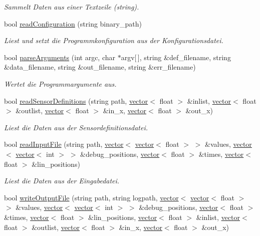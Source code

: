 \begin{DoxyCompactItemize}
\begin{DoxyCompactList}\small\item\em Sammelt Daten aus einer Textzeile (string). \end{DoxyCompactList}\item 
bool \hyperlink{classOdisiToSdConverter_a8c6bc01ae2c063d89dc64c0a7d68c033}{read\-Configuration} (string binary\-\_\-path)
\begin{DoxyCompactList}\small\item\em Liest und setzt die Programmkonfiguration aus der Konfigurationsdatei. \end{DoxyCompactList}\item 
bool \hyperlink{classOdisiToSdConverter_ac8d40f3edad9af5004d516809e0e40a2}{parse\-Arguments} (int argc, char $\ast$argv\mbox{[}$\,$\mbox{]}, string \&def\-\_\-filename, string \&data\-\_\-filename, string \&out\-\_\-filename, string \&err\-\_\-filename)
\begin{DoxyCompactList}\small\item\em Wertet die Programmargumente aus. \end{DoxyCompactList}\item 
bool \hyperlink{classOdisiToSdConverter_a436916f864cbfc7a9cefa5e0f640c683}{read\-Sensor\-Definitions} (string path, \hyperlink{classstd_1_1vector}{vector}$<$ float $>$ \&inlist, \hyperlink{classstd_1_1vector}{vector}$<$ float $>$ \&outlist, \hyperlink{classstd_1_1vector}{vector}$<$ float $>$ \&in\-\_\-x, \hyperlink{classstd_1_1vector}{vector}$<$ float $>$ \&out\-\_\-x)
\begin{DoxyCompactList}\small\item\em Liest die Daten aus der Sensordefinitionsdatei. \end{DoxyCompactList}\item 
bool \hyperlink{classOdisiToSdConverter_a270932ed908757ac477370eef64db442}{read\-Input\-File} (string path, \hyperlink{classstd_1_1vector}{vector}$<$ \hyperlink{classstd_1_1vector}{vector}$<$ float $>$ $>$ \&values, \hyperlink{classstd_1_1vector}{vector}$<$ \hyperlink{classstd_1_1vector}{vector}$<$ int $>$ $>$ \&debug\-\_\-positions, \hyperlink{classstd_1_1vector}{vector}$<$ float $>$ \&times, \hyperlink{classstd_1_1vector}{vector}$<$ float $>$ \&lin\-\_\-positions)
\begin{DoxyCompactList}\small\item\em Liest die Daten aus der Eingabedatei. \end{DoxyCompactList}\item 
bool \hyperlink{classOdisiToSdConverter_a869a2571e5788922826f4bc63adbbe18}{write\-Output\-File} (string path, string logpath, \hyperlink{classstd_1_1vector}{vector}$<$ \hyperlink{classstd_1_1vector}{vector}$<$ float $>$ $>$ \&values, \hyperlink{classstd_1_1vector}{vector}$<$ \hyperlink{classstd_1_1vector}{vector}$<$ int $>$ $>$ \&debug\-\_\-positions, \hyperlink{classstd_1_1vector}{vector}$<$ float $>$ \&times, \hyperlink{classstd_1_1vector}{vector}$<$ float $>$ \&lin\-\_\-positions, \hyperlink{classstd_1_1vector}{vector}$<$ float $>$ \&inlist, \hyperlink{classstd_1_1vector}{vector}$<$ float $>$ \&outlist, \hyperlink{classstd_1_1vector}{vector}$<$ float $>$ \&in\-\_\-x, \hyperlink{classstd_1_1vector}{vector}$<$ float $>$ \&out\-\_\-x)

\end{DoxyCompactItemize}
